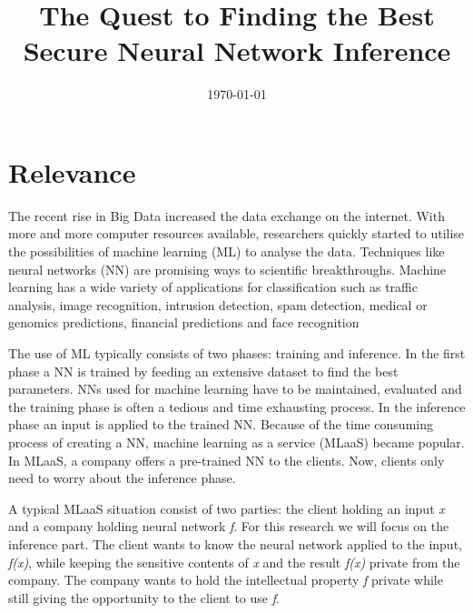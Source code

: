 \documentclass{uva-inf-article}
\title{The Quest to Finding the Best Secure Neural Network Inference}
\date{\today}
\begin{document}
\maketitle




\section{Relevance}
The recent rise in Big Data increased the data exchange on the internet. With more and more computer resources available, researchers quickly started to utilise the possibilities of machine learning (ML) to analyse the data.  Techniques like neural networks (NN) are promising ways to scientific breakthroughs. Machine learning has a wide variety of applications for classification such as traffic analysis, image recognition, intrusion detection,  spam detection, medical or genomics predictions,  financial predictions and face recognition \parencite{Dowlin2017, Islam2011, Bachrach16, Kaiming215}

The use of ML typically consists of two phases: training and inference. In the first phase a NN is trained by feeding an extensive dataset to find the best parameters. NNs used for machine learning have to be maintained, evaluated and the training phase is often a tedious and time exhausting process. In the inference phase an input is applied to the trained NN. Because of the time consuming process of creating a NN, machine learning as a service (MLaaS) became popular. In MLaaS, a company offers a pre-trained NN to the clients. Now, clients only need to worry about the inference phase.

A typical MLaaS situation consist of two parties: the client holding an input \textit{x} and a company holding neural network \textit{f}. For this research we will focus on the inference part. The client wants to know the neural network applied to the input, \textit{f(x)}, while keeping the sensitive contents of \textit{x} and the result \textit{f(x)} private from the company. The company wants to hold the intellectual property \textit{f} private while still giving the opportunity to the client to use \textit{f}. 
\end{document}
